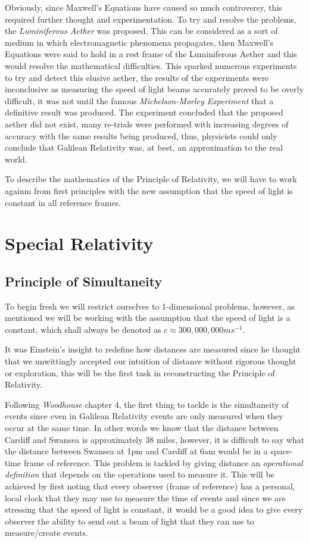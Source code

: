 \documentclass[a4paper,12pt,draft]{report}
\begin{document}
Obviously, since Maxwell's Equations have caused so much controversy, this required further thought and experimentation. To try and resolve the problems, the \emph{Luminiferous Aether} was proposed. This can be considered as a sort of medium in which electromagnetic phenomena propagates, then Maxwell's Equations were said to hold in a rest frame of the Luminiferous Aether and this would resolve the mathematical difficulties. This sparked numerous experiments to try and detect this elusive aether, the results of the experiments were inconclusive as measuring the speed of light beams accurately proved to be overly difficult, it was not until the famous \emph{Michelson-Morley Experiment} that a definitive result was produced. The experiment concluded that the proposed aether did not exist, many re-trials were performed with increasing degrees of accuracy with the same results being produced, thus, physicists could only conclude that Galilean Relativity was, at best, an approximation to the real world.

To describe the mathematics of the Principle of Relativity, we will have to work againm from first principles with the new assumption that the speed of light is constant in all reference frames.


\chapter{Special Relativity}

\section{Principle of Simultaneity}

To begin fresh we will restrict ourselves to 1-dimensional problems, however, as mentioned we will be working with the assumption that the speed of light is a constant, which shall always be denoted as $c \approx 300,000,000ms^{-1}$.

It was Einstein's insight to redefine how distances are measured since he thought that we unwittingly accepted our intuition of distance without rigorous thought or exploration, this will be the first task in reconstructing the Principle of Relativity.

Following \emph{Woodhouse} \cite{NMJW} chapter 4, the first thing to tackle is the simultaneity of events since even in Galilean Relativity events are only measured when they occur at the same time. In other words we know that the distance between Cardiff and Swansea is approximately 38 miles, however, it is difficult to say what the distance between Swansea at 1pm and Cardiff at 6am would be in a space-time frame of reference. This problem is tackled by giving distance an \emph{operational definition} that depends on the operations used to measure it. This will be achieved by first noting that every observer (frame of reference) has a personal, local clock that they may use to measure the time of events and since we are stressing that the speed of light is constant, it would be a good idea to give every observer the ability to send out a beam of light that they can use to measure/create events.
\end{document}
